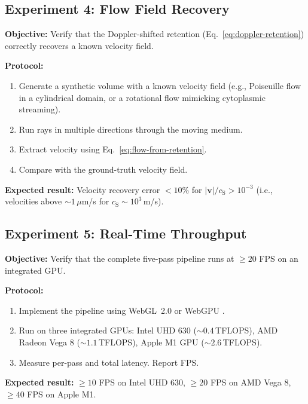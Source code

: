 \documentclass[11pt,twocolumn,a4paper]{article}
\newcommand{\cS}{c_{\mathrm{S}}}
\begin{document}
\subsection{Experiment 4: Flow Field Recovery}

\textbf{Objective:} Verify that the Doppler-shifted retention
(Eq.~\eqref{eq:doppler-retention}) correctly recovers a known
velocity field.

\textbf{Protocol:}
\begin{enumerate}[label=(\roman*),leftmargin=*]
\item Generate a synthetic volume with a known velocity field (e.g.,
  Poiseuille flow in a cylindrical domain, or a rotational flow
  mimicking cytoplasmic streaming).
\item Run rays in multiple directions through the moving medium.
\item Extract velocity using Eq.~\eqref{eq:flow-from-retention}.
\item Compare with the ground-truth velocity field.
\end{enumerate}

\textbf{Expected result:} Velocity recovery error $< 10\%$ for
$|\mathbf{v}|/\cS > 10^{-3}$ (i.e., velocities above
$\sim\!1$\,$\mu$m/s for $\cS \sim 10^3$\,m/s).

\subsection{Experiment 5: Real-Time Throughput}

\textbf{Objective:} Verify that the complete five-pass pipeline runs
at $\geq 20$ FPS on an integrated GPU.

\textbf{Protocol:}
\begin{enumerate}[label=(\roman*),leftmargin=*]
\item Implement the pipeline using WebGL~2.0
  \citep{khronos2024} or WebGPU \citep{webgpu2024}.
\item Run on three integrated GPUs: Intel UHD 630 ($\sim\!0.4$\,TFLOPS),
  AMD Radeon Vega 8 ($\sim\!1.1$\,TFLOPS), Apple M1 GPU
  ($\sim\!2.6$\,TFLOPS).
\item Measure per-pass and total latency. Report FPS.
\end{enumerate}

\textbf{Expected result:} $\geq 10$ FPS on Intel UHD 630, $\geq 20$
FPS on AMD Vega 8, $\geq 40$ FPS on Apple M1.

\end{document}
